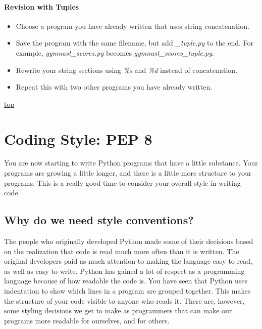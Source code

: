 \documentclass[11pt]{article}
\providecommand{\tightlist}{%
      \setlength{\itemsep}{0pt}\setlength{\parskip}{0pt}}
\begin{document}
\hypertarget{revision-with-tuples}{%
\paragraph{Revision with Tuples}\label{revision-with-tuples}}

\begin{itemize}
\tightlist
\item
  Choose a program you have already written that uses string
  concatenation.
\item
  Save the program with the same filename, but add \emph{\_tuple.py} to
  the end. For example, \emph{gymnast\_scores.py} becomes
  \emph{gymnast\_scores\_tuple.py}.
\item
  Rewrite your string sections using \emph{\%s} and \emph{\%d} instead
  of concatenation.
\item
  Repeat this with two other programs you have already written.
\end{itemize}

    \protect\hyperlink{}{top}

    \hypertarget{coding-style-pep-8}{%
\section{Coding Style: PEP 8}\label{coding-style-pep-8}}

You are now starting to write Python programs that have a little
substance. Your programs are growing a little longer, and there is a
little more structure to your programs. This is a really good time to
consider your overall style in writing code.

\hypertarget{why-do-we-need-style-conventions}{%
\subsection{Why do we need style
conventions?}\label{why-do-we-need-style-conventions}}

The people who originally developed Python made some of their decisions
based on the realization that code is read much more often than it is
written. The original developers paid as much attention to making the
language easy to read, as well as easy to write. Python has gained a lot
of respect as a programming language because of how readable the code
is. You have seen that Python uses indentation to show which lines in a
program are grouped together. This makes the structure of your code
visible to anyone who reads it. There are, however, some styling
decisions we get to make as programmers that can make our programs more
readable for ourselves, and for others.
\end{document}
